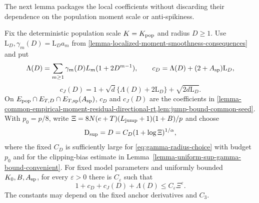 The next lemma packages the local coefficients without discarding their dependence on the population moment scale or anti-spikiness.

\begin{lemma}
\label{lem:comparison-coefficients-v15}
Fix the deterministic population scale $K=K_{\rm pop}$ and radius $D\ge1$.
Use $\mathrm L_D,\gamma_m(D)=\mathrm L_Da_m$ from
\cref{lemma-localized-moment-smoothness-consequences} and put
\[
\Lambda(D)=\sum_{m\ge1}\gamma_m(D)L_m(1+2D^{m-1}),\qquad
c_D=\Lambda(D)+(2+A_{\rm sp})\mathrm L_D,
\]
\[
c_J(D)=1+\sqrt d\{\Lambda(D)+2\mathrm L_D\}+\sqrt{2d\mathrm L_D}.
\]
On $E_{\rm pop}\cap E_{T,D}\cap E_{T,\rm sp}(A_{\rm sp})$,
$c_D$ and $c_J(D)$ are the coefficients in
\cref{lemma-common-empirical-moment-residual-directional-rt,lem:jump-bound-common-seed}.
With $p_0=p/8$, write $\Xi=8N(e+T)(L_{\mathrm{jump}}+1)(1+B)/p$ and choose
\begin{equation}
\label{eq:def-supXY-v15}
\mathrm{D}_{\sup}=D=C_D(1+\log\Xi)^{1/\alpha},
\end{equation}
where the fixed $C_D$ is sufficiently large for
\eqref{eq:gamma-radius-choice} with budget $p_0$ and for the clipping-bias
estimate in Lemma~\ref{lemma-uniform-sup-gamma-bound-convenient}.
For fixed model parameters and uniformly bounded $K_0,B,A_{\rm sp}$,
for every $\varepsilon>0$ there is $C_\varepsilon$ such that
\begin{equation}
\label{eq:Ccmp-localized-v15}
1+c_D+c_J(D)+\Lambda(D)\le C_\varepsilon\Xi^\varepsilon.
\end{equation}
The constants may depend on the fixed anchor derivatives and $C_3$.
\end{lemma}
